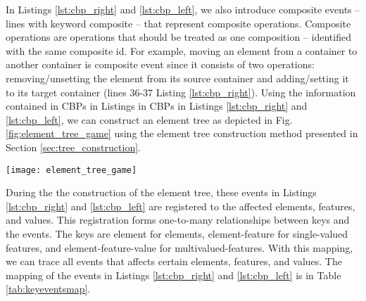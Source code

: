 In Listings \ref{lst:cbp_right} and \ref{lst:cbp_left}, we also introduce composite events -- lines with keyword \textsf{composite} -- that represent composite operations. 
Composite operations are operations that should be treated as one composition -- identified with the same composite id. 
For example, moving an element from a container to another container is composite event since it consists of two operations: 
removing/unsetting the element from its source container and adding/setting it to its target container (lines 36-37 Listing \ref{lst:cbp_right}). 
Using the information contained in CBPs in Listings in CBPs in Listings \ref{lst:cbp_right} and \ref{lst:cbp_left}, 
we can construct an element tree as depicted in Fig. \ref{fig:element_tree_game} using the element tree construction method presented in Section \ref{sec:tree_construction}. 

\begin{figure*}
    \centering
    \texttt{[image: element\_tree\_game]}
    \caption{An element tree constructed using information contained in CBPs in Listings \ref{lst:cbp_right} and \ref{lst:cbp_left}.}
    \label{fig:element_tree_game}
\end{figure*} 

During the the construction of the element tree, these events in Listings \ref{lst:cbp_right} and \ref{lst:cbp_left} are registered to the affected elements, features, and values. 
This registration forms one-to-many relationships between keys and the events. 
The keys are \textsf{element} for elements, \textsf{element-feature} for single-valued features, and \textsf{element-feature-value} for multivalued-features.
With this mapping, we can trace all events that affects certain elements, features, and values. 
The mapping of the events in Listings \ref{lst:cbp_right} and \ref{lst:cbp_left} is in Table \ref{tab:keyeventsmap}.

